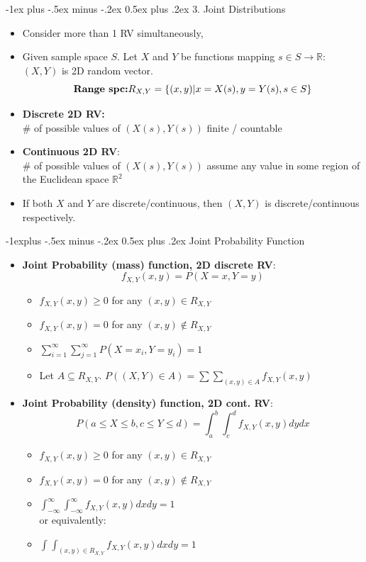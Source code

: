 \documentclass[12pt, landscape]{article}
\makeatletter
\renewcommand{\section}{\@startsection{section}{1}{0mm}%
                                {-1ex plus -.5ex minus -.2ex}%
                                {0.5ex plus .2ex}%
                                {\normalfont\large\bfseries}}
\renewcommand{\subsection}{\@startsection{subsection}{2}{0.1mm}%
                                {-1explus -.5ex minus -.2ex}%
                                {0.5ex plus .2ex}%
                                {\normalfont\normalsize\bfseries}}
\makeatother
\begin{document}
\begin{multicols*}{3}


\section{3. Joint Distributions}
\begin{itemize}
    \item Consider more than 1 RV simultaneously, 
    \item Given sample space $S$. Let $X$ and $Y$ be functions mapping $s \in S \to \mathbb{R}$: $(X, Y)$ is 2D random vector.
    \[\text{\textbf{Range spc:}} R_{X, Y} = \{(x,y) | x = X(s), y=Y(s), s \in S\}\]
    \item \textbf{Discrete 2D RV:} \\
    {\# of possible values of $(X(s), Y(s))$ finite / countable}
    \item \textbf{Continuous 2D RV}:  \\
    	{\# of possible values of $(X(s), Y(s))$ assume any value in some region of the Euclidean space $\mathbb{R}^2$}
    \item If both $X$ and $Y$ are discrete/continuous, then $(X, Y)$ is discrete/continuous respectively.
\end{itemize}

\subsection{Joint Probability Function}

\begin{itemize}
     \item \textbf{Joint Probability (mass) function, 2D discrete RV}:
    \[f_{X,Y} (x,y) = P(X = x, Y = y)\]
    \begin{itemize}
        \item $f_{X,Y} (x,y) \geq 0$ for any $(x,y) \in R_{X,Y}$
        \item $f_{X,Y} (x,y) = 0$ for any $(x,y) \notin R_{X,Y}$
        \item $\sum _{i=1} ^{\infty} \sum _{j=1} ^{\infty} P(X = x_i, Y = y_i) = 1$
        \item Let $A \subseteq R_{X, Y}$. $P((X,Y) \in A) = \sum \sum _{(x,y) \in A} f_{X, Y}(x,y)$
    \end{itemize}
     \item \textbf{Joint Probability (density) function, 2D cont. RV}:
    \[P(a \leq X \leq b, c \leq Y \leq d) = \int _a ^b \int _c ^d f_{X, Y} (x, y)dydx\]
    \begin{itemize}
        \item $f_{X,Y} (x,y) \geq 0$ for any $(x,y) \in R_{X,Y}$
        \item $f_{X,Y} (x,y) = 0$ for any $(x,y) \notin R_{X,Y}$
        \item $\int _{-\infty} ^{\infty} \int _{-\infty} ^{\infty} f_{X,Y} (x,y)dxdy = 1$ \\
        or equivalently:
        \item $\int _{} ^{} \int _{(x,y) \in R_{X,Y}} ^{} f_{X,Y} (x,y)dxdy = 1$
    \end{itemize}
\end{itemize}


\end{multicols*}
\end{document}
